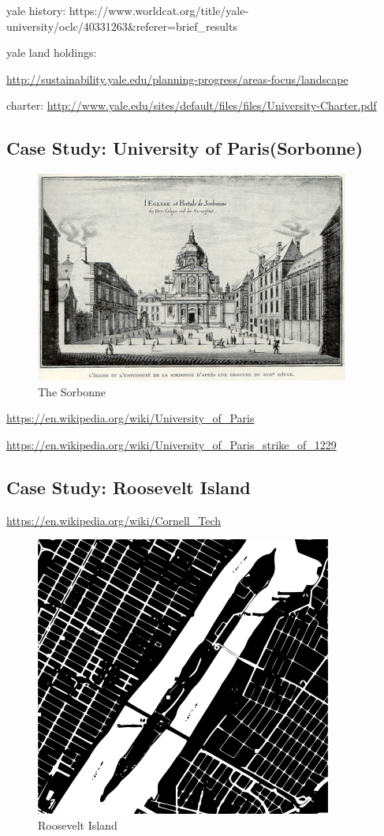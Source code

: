 yale history:
https://www.worldcat.org/title/yale-university/oclc/40331263\&referer=brief\_results

yale land holdings:

\url{http://sustainability.yale.edu/planning-progress/areas-focus/landscape}

charter:
\url{http://www.yale.edu/sites/default/files/files/University-Charter.pdf}

\subsection{Case Study: University of
Paris(Sorbonne)}\label{case-study-university-of-parissorbonne}

\begin{figure}[htbp]
\centering
\includegraphics{images/Sorbonne.png}
\caption{The Sorbonne}
\end{figure}

\url{https://en.wikipedia.org/wiki/University_of_Paris}

\url{https://en.wikipedia.org/wiki/University_of_Paris_strike_of_1229}

\subsection{Case Study: Roosevelt
Island}\label{case-study-roosevelt-island}

\url{https://en.wikipedia.org/wiki/Cornell_Tech}

\begin{figure}[htbp]
\centering
\includegraphics{images/roosevelt.png}
\caption{Roosevelt Island}
\end{figure}

